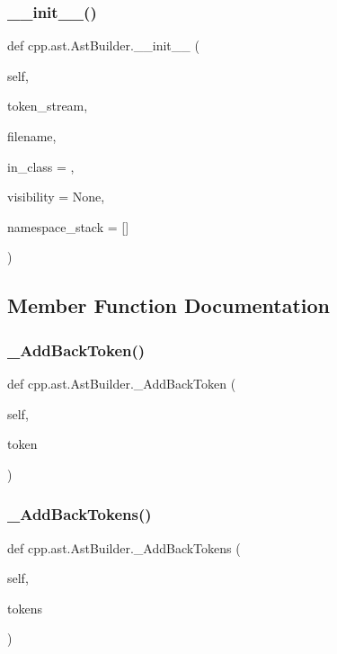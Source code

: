 \subsubsection{\texorpdfstring{\_\_init\_\_()}{\_\_init\_\_()}}
{\footnotesize\ttfamily def cpp.\+ast.\+Ast\+Builder.\+\_\+\+\_\+init\+\_\+\+\_\+ (\begin{DoxyParamCaption}\item[{}]{self,  }\item[{}]{token\+\_\+stream,  }\item[{}]{filename,  }\item[{}]{in\+\_\+class = {\ttfamily \textquotesingle{}\textquotesingle{}},  }\item[{}]{visibility = {\ttfamily None},  }\item[{}]{namespace\+\_\+stack = {\ttfamily \mbox{[}\mbox{]}} }\end{DoxyParamCaption})}



\subsection{Member Function Documentation}
\mbox{\label{classcpp_1_1ast_1_1_ast_builder_a264b4e18c07863c4dae117fe623a0fb2}} 
\subsubsection{\texorpdfstring{\_AddBackToken()}{\_AddBackToken()}}
{\footnotesize\ttfamily def cpp.\+ast.\+Ast\+Builder.\+\_\+\+Add\+Back\+Token (\begin{DoxyParamCaption}\item[{}]{self,  }\item[{}]{token }\end{DoxyParamCaption})\hspace{0.3cm}{\ttfamily [private]}}

\mbox{\label{classcpp_1_1ast_1_1_ast_builder_aa148966c6578f4560a4164db33df0fcf}} 
\subsubsection{\texorpdfstring{\_AddBackTokens()}{\_AddBackTokens()}}
{\footnotesize\ttfamily def cpp.\+ast.\+Ast\+Builder.\+\_\+\+Add\+Back\+Tokens (\begin{DoxyParamCaption}\item[{}]{self,  }\item[{}]{tokens }\end{DoxyParamCaption})\hspace{0.3cm}{\ttfamily [private]}}

